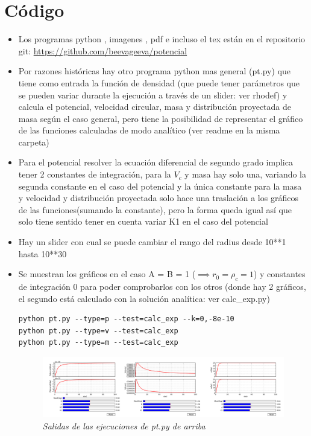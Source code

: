 \documentclass[12pt]{book}
\begin{document}
\newpage

\section*{Código}

\begin{itemize}

	\item Los programas python , imagenes , pdf e incluso el tex están en el repositorio git: \url{https://github.com/beevageeva/potencial} 
	 
	\item Por razones históricas hay otro programa python mas general  (pt.py)  que tiene como entrada la función de densidad (que puede tener parámetros que se pueden variar durante la ejecución a través de un slider: ver rhodef) y calcula el potencial, velocidad circular, masa y distribución proyectada de masa según el caso general, pero tiene la posibilidad de representar el gráfico de las funciones calculadas de modo analítico (ver readme en la misma carpeta)
\item Para el potencial resolver la ecuación diferencial de segundo grado implica tener 2 constantes de integración, para la $V_c$ y masa hay solo una, variando la segunda constante en el caso del potencial y la única constante para la masa y velocidad y distribución proyectada solo hace una traslación a los gráficos de las funciones(sumando la constante), pero la forma queda igual así que solo tiene sentido tener en cuenta variar K1 en el caso del potencial 
\item Hay un slider con cual se puede cambiar el rango del radius desde 10**1 hasta 10**30
\item Se muestran los gráficos en el caso A = B = 1 ($\implies r_0= \rho_c =1$) y constantes de integración 0 para poder comprobarlos con los otros (donde hay 2 gráficos, el segundo está calculado con la solución analítica: ver calc\_exp.py)

\begin{verbatim}
python pt.py --type=p --test=calc_exp --k=0,-8e-10 
python pt.py --type=v --test=calc_exp 
python pt.py --type=m --test=calc_exp 

\end{verbatim}
\begin{figure}[!ht]
 \centering
 \includegraphics[scale=0.18]{ptAll.png}
 \caption{\emph{Salidas de las ejecuciones de pt.py de arriba}}
\end{figure}



\end{itemize}
\end{document}
